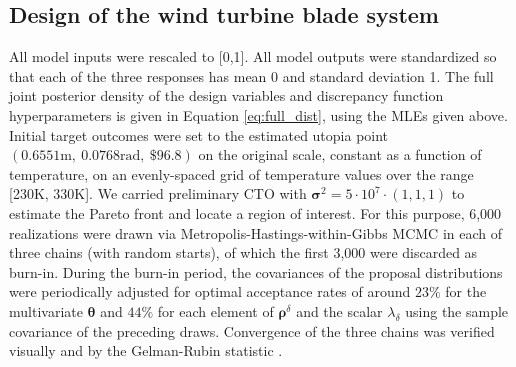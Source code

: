 \documentclass[12pt]{article}
\begin{document}
\subsection{Design of the wind turbine blade system}\label{the_model}
%
All model inputs were rescaled to [0,1]. 
%
All model outputs were standardized so that each of the three responses has mean 0 and standard deviation 1.
%
The full joint posterior density of the design variables and discrepancy function hyperparameters is given in Equation \eqref{eq:full_dist}, using the MLEs given above.
%
Initial target outcomes were set to the estimated utopia point $(0.6551\mathrm{m},\ 0.0768\mathrm{rad},\ \$96.8)$ on the original scale, constant as a function of temperature, on an evenly-spaced grid of temperature values over the range [230K, 330K].
%
We carried preliminary CTO with $\boldsymbol\sigma^2=5\cdot10^7\cdot(1,1,1)$ to estimate the Pareto front and locate a region of interest. %
%
For this purpose, 6,000 realizations were drawn via Metropolis-Hastings-within-Gibbs MCMC \citep{Metropolis1953, Hastings1970, Geman1984} in each of three chains (with random starts), of which the first 3,000 were discarded as burn-in. 
%
During the burn-in period, the covariances of the proposal distributions were periodically adjusted for optimal acceptance rates of around $23\%$ for the multivariate $\boldsymbol \theta$ and $44\%$ for each element of $\boldsymbol\rho^\delta$ \citep{Roberts1997} and the scalar $\lambda_\delta$ \citep[][p. 296]{Gelman2013} using the sample covariance of the preceding draws. %
%
%
%
Convergence of the three chains was verified visually and by the Gelman-Rubin statistic \citep[$\approx1.01$;][]{Gelman1992a}.
%
\end{document}
